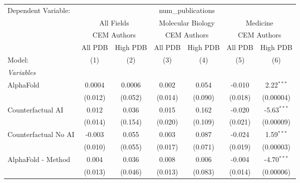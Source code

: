 \begingroup
\centering
\begin{tabular}{lcccccc}
   \tabularnewline \midrule \midrule
   Dependent Variable: & \multicolumn{6}{c}{num\_publications}\\
 & \multicolumn{2}{c}{All Fields} & \multicolumn{2}{c}{Molecular Biology} & \multicolumn{2}{c}{Medicine} \\
\cmidrule(lr){2-3} \cmidrule(lr){4-5} \cmidrule(lr){6-7}
 & \multicolumn{2}{c}{CEM Authors} & \multicolumn{2}{c}{CEM Authors} & \multicolumn{2}{c}{CEM Authors} \\
\cmidrule(lr){2-3} \cmidrule(lr){4-5} \cmidrule(lr){6-7}
 & \multicolumn{1}{c}{All PDB} & \multicolumn{1}{c}{High PDB} & \multicolumn{1}{c}{All PDB} & \multicolumn{1}{c}{High PDB} & \multicolumn{1}{c}{All PDB} & \multicolumn{1}{c}{High PDB} \\
\cmidrule(lr){2-2} \cmidrule(lr){3-3} \cmidrule(lr){4-4} \cmidrule(lr){5-5} \cmidrule(lr){6-6} \cmidrule(lr){7-7}
   Model:                                                     & (1)     & (2)         & (3)          & (4)            & (5)          & (6)\\  
   \midrule
   \emph{Variables}\\
   AlphaFold                                                  & 0.0004  & 0.0006      & 0.002        & 0.054          & -0.010       & 2.22$^{***}$\\   
                                                              & (0.012) & (0.052)     & (0.014)      & (0.090)        & (0.018)      & (0.00004)\\   
   Counterfactual AI                                          & 0.012   & 0.036       & 0.015        & 0.162          & -0.020       & -5.63$^{***}$\\   
                                                              & (0.014) & (0.154)     & (0.020)      & (0.109)        & (0.021)      & (0.00009)\\   
   Counterfactual No AI                                       & -0.003  & 0.055       & 0.003        & 0.087          & -0.024       & 1.59$^{***}$\\   
                                                              & (0.010) & (0.055)     & (0.017)      & (0.071)        & (0.019)      & (0.00003)\\   
   AlphaFold - Method                                         & 0.004   & 0.036       & 0.008        & 0.006          & -0.004       & -4.70$^{***}$\\   
                                                              & (0.013) & (0.046)     & (0.013)      & (0.083)        & (0.014)      & (0.00006)\\   

\end{tabular}

